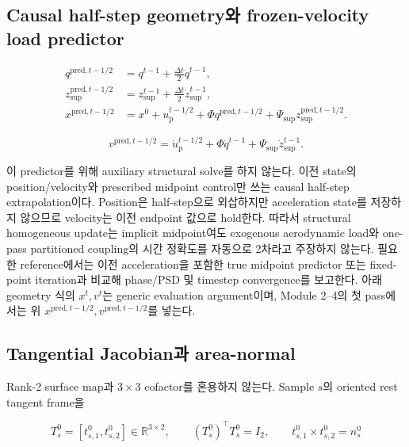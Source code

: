 \documentclass[11pt,a4paper]{article}
\newcommand{\R}{\mathbb{R}}
\begin{document}
\subsection*{Causal half-step geometry와 frozen-velocity load predictor}

\begin{equation}
\begin{aligned}
  q^{\mathrm{pred},t-1/2}
  &=q^{t-1}+\frac{\Delta t}{2}\dot q^{t-1},\\
  z_{\mathrm{sup}}^{\mathrm{pred},t-1/2}
  &=z_{\mathrm{sup}}^{t-1}
    +\frac{\Delta t}{2}\dot z_{\mathrm{sup}}^{t-1},\\
  x^{\mathrm{pred},t-1/2}
  &=x^0+u_{\mathrm p}^{t-1/2}
  +\Phi q^{\mathrm{pred},t-1/2}
  +\Psi_{\mathrm{sup}}z_{\mathrm{sup}}^{\mathrm{pred},t-1/2}.
\end{aligned}
  \label{eq:causal-midpoint-geometry-predictor}
\end{equation}

\begin{equation}
  v^{\mathrm{pred},t-1/2}
  =\dot u_{\mathrm p}^{t-1/2}
  +\Phi\dot q^{t-1}+\Psi_{\mathrm{sup}}\dot z_{\mathrm{sup}}^{t-1}.
\end{equation}

이 predictor를 위해 auxiliary structural solve를 하지 않는다.
이전 state의 position/velocity와 prescribed midpoint control만 쓰는 causal half-step extrapolation이다.
Position은 half-step으로 외삽하지만 acceleration state를 저장하지 않으므로 velocity는
이전 endpoint 값으로 hold한다. 따라서 structural homogeneous update는 implicit midpoint여도
exogenous aerodynamic load와 one-pass partitioned coupling의 시간 정확도를 자동으로 2차라고 주장하지 않는다.
필요한 reference에서는 이전 acceleration을 포함한 true midpoint predictor 또는 fixed-point iteration과
비교해 phase/PSD 및 timestep convergence를 보고한다.
아래 geometry 식의 \(x^t,v^t\)는 generic evaluation argument이며,
Module 2--4의 첫 pass에서는 위
\(x^{\mathrm{pred},t-1/2},v^{\mathrm{pred},t-1/2}\)를 넣는다.

\subsection*{Tangential Jacobian과 area-normal}

Rank-2 surface map과 \(3\times3\) cofactor를 혼용하지 않는다.
Sample \(s\)의 oriented rest tangent frame을

\begin{equation}
  T_s^0=[t_{s,1}^0,t_{s,2}^0]\in\R^{3\times2},
  \qquad
  (T_s^0)^\top T_s^0=I_2,
  \qquad
  t_{s,1}^0\times t_{s,2}^0=n_s^0
\end{equation}
\end{document}
